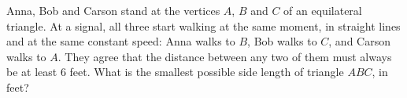 Anna, Bob and Carson stand at the vertices $A$, $B$ and $C$ of an equilateral triangle. At a signal, all three start walking at the same moment, in straight lines and at the same constant speed: Anna walks to $B$, Bob walks to $C$, and Carson walks to $A$. They agree that the distance between any two of them must always be at least $6$ feet. What is the smallest possible side length of triangle $ABC$, in feet?
